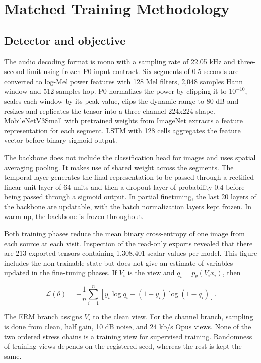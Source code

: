 \section{Matched Training Methodology}\label{sec:methods}

\subsection{Detector and objective}

The audio decoding format is mono with a sampling rate of 22.05 kHz and three-second limit using frozen P0 input contract. Six segments of 0.5 seconds are converted to log-Mel power features with 128 Mel filters, 2,048 samples Hann window and 512 samples hop. P0 normalizes the power by clipping it to \(10^{-10}\), scales each window by its peak value, clips the dynamic range to 80 dB and resizes and replicates the tensor into a three channel 224x224 shape. MobileNetV3Small with pretrained weights from ImageNet extracts a feature representation for each segment. LSTM with 128 cells aggregates the feature vector before binary sigmoid output.

The backbone does not include the classification head for images and uses spatial averaging pooling. It makes use of shared weight across the segments. The temporal layer generates the final representation to be passed through a rectified linear unit layer of 64 units and then a dropout layer of probability 0.4 before being passed through a sigmoid output. In partial finetuning, the last 20 layers of the backbone are updatable, with the batch normalization layers kept frozen. In warm-up, the backbone is frozen throughout.

Both training phases reduce the mean binary cross-entropy of one image from each source at each visit. Inspection of the read-only exports revealed that there are 213 exported tensors containing 1,308,401 scalar values per model. This figure includes the non-trainable state but does not give an estimate of variables updated in the fine-tuning phases. If \(V_i\) is the view and \(q_i=p_\theta(V_i x_i)\), then

\begin{equation}
 \mathcal{L}(\theta)=-\frac{1}{n}\sum_{i=1}^{n}
 [y_i\log q_i+(1-y_i)\log(1-q_i)] .
\end{equation}

The ERM branch assigns \(V_i\) to the clean view. For the channel branch, sampling is done from clean, half gain, 10 dB noise, and 24 kb/s Opus views. None of the two ordered stress chains is a training view for supervised training. Randomness of training views depends on the registered seed, whereas the rest is kept the same.

